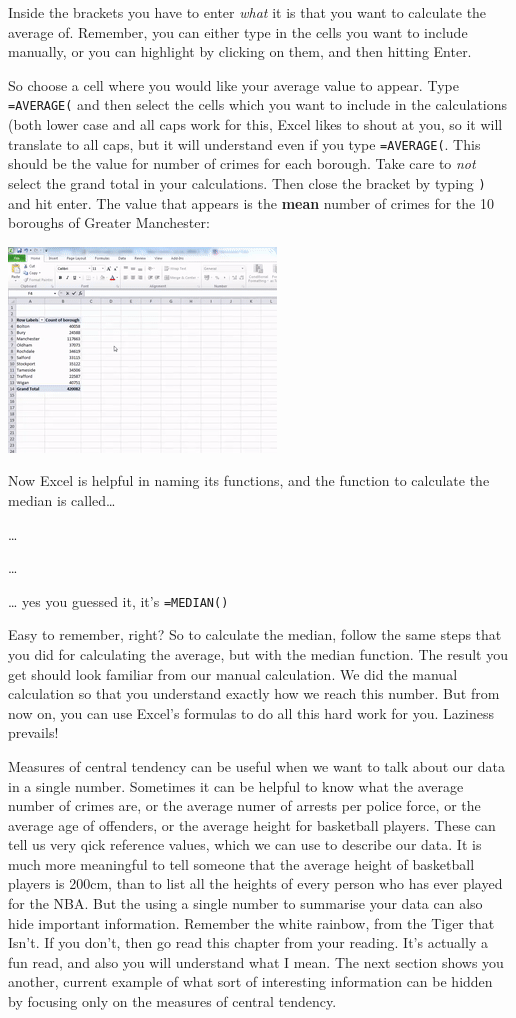 \documentclass[
]{book}
\begin{document}
Inside the brackets you have to enter \emph{what} it is that you want to calculate the average of. Remember, you can either type in the cells you want to include manually, or you can highlight by clicking on them, and then hitting Enter.

So choose a cell where you would like your average value to appear. Type \texttt{=AVERAGE(} and then select the cells which you want to include in the calculations (both lower case and all caps work for this, Excel likes to shout at you, so it will translate to all caps, but it will understand even if you type \texttt{=AVERAGE(}. This should be the value for number of crimes for each borough. Take care to \emph{not} select the grand total in your calculations. Then close the bracket by typing \texttt{)} and hit enter. The value that appears is the \textbf{mean} number of crimes for the 10 boroughs of Greater Manchester:

\includegraphics{imgs/calc_avg.gif}

Now Excel is helpful in naming its functions, and the function to calculate the median is called\ldots{}

\ldots{}

\ldots{}

\ldots{} yes you guessed it, it's \texttt{=MEDIAN()}

Easy to remember, right? So to calculate the median, follow the same steps that you did for calculating the average, but with the median function. The result you get should look familiar from our manual calculation. We did the manual calculation so that you understand exactly how we reach this number. But from now on, you can use Excel's formulas to do all this hard work for you. Laziness prevails!

Measures of central tendency can be useful when we want to talk about our data in a single number. Sometimes it can be helpful to know what the average number of crimes are, or the average numer of arrests per police force, or the average age of offenders, or the average height for basketball players. These can tell us very qick reference values, which we can use to describe our data. It is much more meaningful to tell someone that the average height of basketball players is 200cm, than to list all the heights of every person who has ever played for the NBA. But the using a single number to summarise your data can also hide important information. Remember the white rainbow, from the Tiger that Isn't. If you don't, then go read this chapter from your reading. It's actually a fun read, and also you will understand what I mean. The next section shows you another, current example of what sort of interesting information can be hidden by focusing only on the measures of central tendency.
\end{document}
